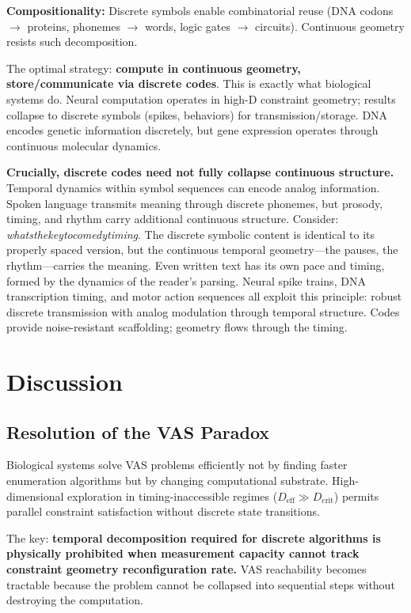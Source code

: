 \documentclass[12pt]{article}
\begin{document}
\textbf{Compositionality:} Discrete symbols enable combinatorial reuse (DNA codons $\to$ proteins, phonemes $\to$ words, logic gates $\to$ circuits). Continuous geometry resists such decomposition.

The optimal strategy: \textbf{compute in continuous geometry, store/communicate via discrete codes}. This is exactly what biological systems do. Neural computation operates in high-D constraint geometry; results collapse to discrete symbols (spikes, behaviors) for transmission/storage. DNA encodes genetic information discretely, but gene expression operates through continuous molecular dynamics.

\textbf{Crucially, discrete codes need not fully collapse continuous structure.} Temporal dynamics within symbol sequences can encode analog information. Spoken language transmits meaning through discrete phonemes, but prosody, timing, and rhythm carry additional continuous structure. Consider: \textit{whatsthekeytocomedytiming}. The discrete symbolic content is identical to its properly spaced version, but the continuous temporal geometry—the pauses, the rhythm—carries the meaning. Even written text has its own pace and timing, formed by the dynamics of the reader's parsing. Neural spike trains, DNA transcription timing, and motor action sequences all exploit this principle: robust discrete transmission with analog modulation through temporal structure. Codes provide noise-resistant scaffolding; geometry flows through the timing.

\section{Discussion}

\subsection{Resolution of the VAS Paradox}

Biological systems solve VAS problems efficiently not by finding faster enumeration algorithms but by changing computational substrate. High-dimensional exploration in timing-inaccessible regimes ($D_{\text{eff}} \gg D_{\text{crit}}$) permits parallel constraint satisfaction without discrete state transitions.

The key: \textbf{temporal decomposition required for discrete algorithms is physically prohibited when measurement capacity cannot track constraint geometry reconfiguration rate.} VAS reachability becomes tractable because the problem cannot be collapsed into sequential steps without destroying the computation.
\end{document}
